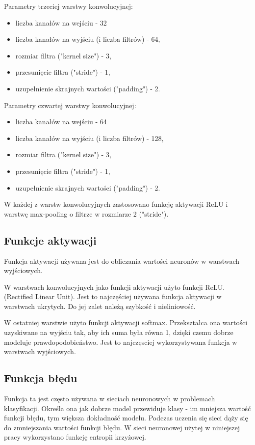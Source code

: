 \documentclass{sprz}
\begin{document}
Parametry trzeciej warstwy konwolucyjnej:
\begin{itemize}
  \item{liczba kanałów na wejściu - 32}
  \item{liczba kanałów na wyjściu (i liczba filtrów) - 64,}
  \item{rozmiar filtra ("kernel size") - 3,}
  \item {przesunięcie filtra ("stride") - 1,}
  \item{uzupełnienie skrajnych wartości ("padding") - 2.}
\end{itemize}

Parametry czwartej warstwy konwolucyjnej:
\begin{itemize}
  \item{liczba kanałów na wejściu - 64}
  \item{liczba kanałów na wyjściu (i liczba filtrów) - 128,}
  \item{rozmiar filtra ("kernel size") - 3,}
  \item {przesunięcie filtra ("stride") - 1,}
  \item{uzupełnienie skrajnych wartości ("padding") - 2.}
\end{itemize}


W każdej z warstw konwolucyjnych zastosowano funkcję aktywacji ReLU i warstwę max-pooling o filtrze w rozmiarze 2 ("stride").

\subsection{Funkcje aktywacji}
Funkcja aktywacji używana jest do obliczania wartości neuronów w warstwach wyjściowych.

W warstwach konwolucyjnych jako funkcji aktywacji użyto funkcji ReLU. (Rectified Linear Unit). Jest to najczęściej używana funkcja aktywacji w warstwach ukrytych. Do jej zalet należą szybkość i nieliniowość.

W ostatniej warstwie użyto funkcji aktywacji softmax. Przekształca ona wartości uzyskiwane na wyjściu tak, aby ich suma była równa 1, dzięki czemu dobrze modeluje prawdopodobieństwo. Jest to najczęsciej wykorzystywana funkcja w warstwach wyjściowych.

\subsection{Funkcja błędu}
Funkcja ta jest często używana w sieciach neuronowych w problemach klasyfikacji. Określa ona jak dobrze model przewiduje klasy - im mniejsza wartość funkcji błędu, tym większa dokładność modelu. Podczas uczenia się sieci dąży się do zmniejszania wartości funkcji błędu. W sieci neuronowej użytej w niniejszej pracy wykorzystano funkcję entropii krzyżowej.
\end{document}
